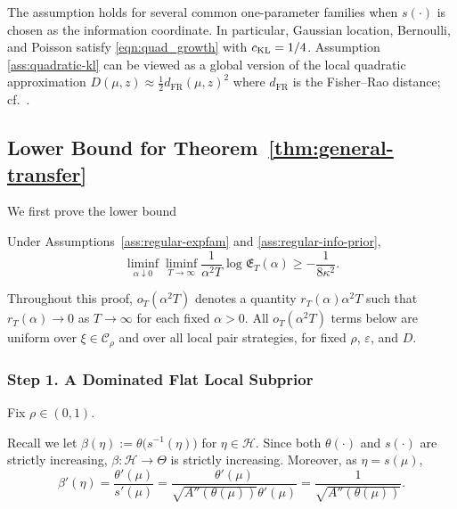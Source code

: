 \documentclass[10pt]{article}
\theoremstyle{plain}
\begin{document}
\begingroup
\renewcommand{\thesection}{4}
\AssQuadraticKL*
\endgroup
The assumption holds for several common one-parameter families when $s(\cdot)$ is chosen as the information coordinate. In particular, Gaussian location, Bernoulli,  and Poisson  satisfy \eqref{eqn:quad_growth} with $c_{\rm KL}=1/4$.  Assumption \ref{ass:quadratic-kl} can be viewed as a global version of the local quadratic approximation $D(\mu,z)\approx\frac{1}{2}d_{\mathrm{FR}}(\mu,z)^2$ where $d_{\mathrm{FR}}$ is the Fisher--Rao distance; cf.\  \citet{amari2000methods}.



\subsection{Lower Bound for Theorem~\ref{thm:general-transfer}}
\label{app:transfer-lower-proof}
We first prove the lower bound
\begin{theorem}
\label{thm:transfer-lower}
Under Assumptions~\ref{ass:regular-expfam} and \ref{ass:regular-info-prior}, 
\[
    \liminf_{\alpha\downarrow0}
    \liminf_{T\to\infty}
    \frac{1}{\alpha^2T}
    \log \mathfrak E_T(\alpha)
    \ge
    -\frac{1}{8\kappa^2}.
\]
\end{theorem}
Throughout this proof, \(o_T(\alpha^2T)\) denotes a quantity $r_T(\alpha)\alpha^2T$ such that \(r_T(\alpha)\to0\) as \(T\to\infty\) for each fixed \(\alpha>0\).
All $o_T(\alpha^2T)$ terms below are uniform over $\xi\in\mathcal C_\rho$ and over all local pair strategies, for fixed $\rho$, $\varepsilon$, and $D$.

\subsubsection{Step 1. A Dominated Flat Local Subprior}
\label{subsubsec:flat-local-subprior-transfer-lower}

Fix $\rho\in(0,1)$.

Recall we let $\beta(\eta):=\theta\bigl(s^{-1}(\eta)\bigr)$ for $\eta\in\mathcal H$.
Since both $\theta(\cdot)$ and $s(\cdot)$ are strictly increasing,
$\beta:\mathcal H\to\Theta$ is strictly increasing. Moreover, as \(\eta=s(\mu)\),
\[
    \beta'(\eta)
    =
    \frac{\theta'(\mu)}{s'(\mu)}
    =
    \frac{\theta'(\mu)}
         {\sqrt{A''(\theta(\mu))}\theta'(\mu)}
    =
    \frac{1}{\sqrt{A''(\theta(\mu))}}.
\]
\end{document}
